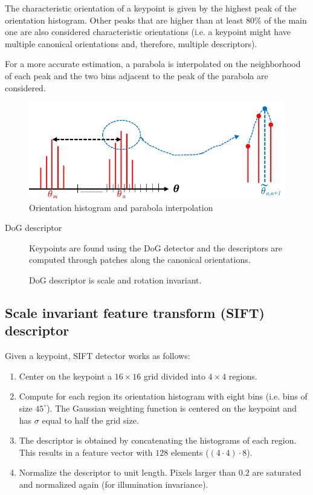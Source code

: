 \begin{description}
\begin{description}
                The characteristic orientation of a keypoint is given by the highest peak of the orientation histogram.
                Other peaks that are higher than at least $80\%$ of the main one are also considered characteristic orientations
                (i.e. a keypoint might have multiple canonical orientations and, therefore, multiple descriptors).

                For a more accurate estimation, a parabola is interpolated on the neighborhood of each peak and
                the two bins adjacent to the peak of the parabola are considered.

                \begin{figure}[H]
                    \centering
                    \includegraphics[width=0.45\linewidth]{./img/_canonical_histogram.pdf}
                    \caption{Orientation histogram and parabola interpolation}
                \end{figure}
        \end{description}
\end{description}

\begin{description}
    \item[DoG descriptor] 
        Keypoints are found using the DoG detector and the descriptors are computed through patches along the canonical orientations.

        \begin{remark}
            DoG descriptor is scale and rotation invariant.
        \end{remark}
\end{description}


\subsection{Scale invariant feature transform (SIFT) descriptor}

Given a keypoint, SIFT detector works as follows:
\begin{enumerate}
    \item Center on the keypoint a $16 \times 16$ grid divided into $4 \times 4$ regions.
    \item Compute for each region its orientation histogram with eight bins (i.e. bins of size $45^\circ$).
        The Gaussian weighting function is centered on the keypoint and has $\sigma$ equal to half the grid size.
    \item The descriptor is obtained by concatenating the histograms of each region. 
        This results in a feature vector with $128$ elements ($(4 \cdot 4) \cdot 8$).
    \item Normalize the descriptor to unit length. Pixels larger than $0.2$ are saturated and normalized again (for illumination invariance).
\end{enumerate}

